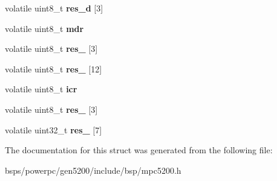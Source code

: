 \begin{DoxyCompactItemize}
\mbox{\label{structmpc5200___1_1mpc5200__i2c__regs__s_adc13cdad490d2ddec872b276c200ac25}} 
volatile uint8\+\_\+t {\bfseries res\+\_\+d} \mbox{[}3\mbox{]}
\item 
\mbox{\label{structmpc5200___1_1mpc5200__i2c__regs__s_a4df5dce6262a122a0299ef4335b8fb98}} 
volatile uint8\+\_\+t {\bfseries mdr}
\item 
\mbox{\label{structmpc5200___1_1mpc5200__i2c__regs__s_ab6297a66b27a74819c02443b9207bb98}} 
volatile uint8\+\_\+t {\bfseries res\+\_} \mbox{[}3\mbox{]}
\item 
\mbox{\label{structmpc5200___1_1mpc5200__i2c__regs__s_a1714d4483fd85040461c2c65a778f2e9}} 
volatile uint8\+\_\+t {\bfseries res\+\_} \mbox{[}12\mbox{]}
\item 
\mbox{\label{structmpc5200___1_1mpc5200__i2c__regs__s_a1fddc49e0e3630f726135aedaa7265fc}} 
volatile uint8\+\_\+t {\bfseries icr}
\item 
\mbox{\label{structmpc5200___1_1mpc5200__i2c__regs__s_a04fa7f53f306d36627a8af6958b0d9a5}} 
volatile uint8\+\_\+t {\bfseries res\+\_} \mbox{[}3\mbox{]}
\item 
\mbox{\label{structmpc5200___1_1mpc5200__i2c__regs__s_af555502eec4f72cc0f812ccc81ee7db5}} 
volatile uint32\+\_\+t {\bfseries res\+\_} \mbox{[}7\mbox{]}
\end{DoxyCompactItemize}


The documentation for this struct was generated from the following file\+:\begin{DoxyCompactItemize}
\item 
bsps/powerpc/gen5200/include/bsp/mpc5200.\+h\end{DoxyCompactItemize}
